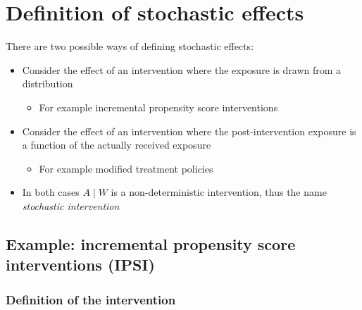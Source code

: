 \documentclass[
  12pt,
]{book}
\providecommand{\tightlist}{%
  \setlength{\itemsep}{0pt}\setlength{\parskip}{0pt}}
\theoremstyle{definition}
\theoremstyle{definition}
\theoremstyle{definition}
\newcommand{\1}{\mathbbm{1}}
\begin{document}
\hypertarget{definition-of-stochastic-effects}{%
\section{Definition of stochastic effects}\label{definition-of-stochastic-effects}}

There are two possible ways of defining stochastic effects:

\begin{itemize}
\tightlist
\item
  Consider the effect of an intervention where the exposure is drawn from a
  distribution

  \begin{itemize}
  \tightlist
  \item
    For example incremental propensity score interventions
  \end{itemize}
\end{itemize}

\begin{itemize}
\tightlist
\item
  Consider the effect of an intervention where the post-intervention exposure is
  a function of the actually received exposure

  \begin{itemize}
  \tightlist
  \item
    For example modified treatment policies
  \end{itemize}
\item
  In both cases \(A \mid W\) is a non-deterministic intervention, thus the name
  \emph{stochastic intervention}
\end{itemize}

\hypertarget{ipsi}{%
\subsection{\texorpdfstring{Example: incremental propensity score interventions (IPSI) \citep{kennedy2018nonparametric}}{Example: incremental propensity score interventions (IPSI) {[}@kennedy2018nonparametric{]}}}\label{ipsi}}

\hypertarget{definition-of-the-intervention}{%
\subsubsection*{Definition of the intervention}\label{definition-of-the-intervention}}
\end{document}
